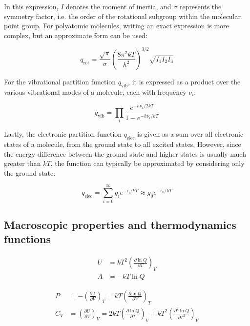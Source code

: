 In this expression, $I$ denotes the moment of inertia, and $\sigma$ represents the symmetry factor, i.e. the order of the rotational subgroup within the molecular point group. For polyatomic molecules, writing an exact expression is more complex, but an approximate form can be used:

\begin{equation}
q_{\text{rot}} = \frac{\sqrt{\pi}}{\sigma}\left(\frac{8\pi^2kT}{h^2}\right)^{3/2} \sqrt{I_1I_2I_3}
\end{equation}

For the vibrational partition function $q_\text{vib}$, it is expressed as a product over the various vibrational modes of a molecule, each with frequency $\nu_i$:

\begin{equation}
q_{\text{vib}} = \prod_{i} \frac{e^{-h\nu_i/2kT}}{1-e^{-h\nu_i/kT}}
\end{equation}

Lastly, the electronic partition function $q_\text{elec}$ is given as a sum over all electronic states of a molecule, from the ground state to all excited states. However, since the energy difference between the ground state and higher states is usually much greater than $kT$, the function can typically be approximated by considering only the ground state:

\begin{equation}
q_{\text{elec}} = \sum_{i=0}^{\infty} g_i e^{-\epsilon_i/kT} \approx g_0 e^{-\epsilon_0/kT}
\end{equation}

\subsection{Macroscopic properties and thermodynamics functions}

\begin{align}
U &= kT^2 \left(\frac{\partial \ln Q}{\partial T}\right)_V \\
A &= -kT\ln Q \tag{14.18}
\end{align}

\begin{align}
P &= -\left(\frac{\partial A}{\partial V}\right)_T = kT\left(\frac{\partial \ln Q}{\partial V}\right)_T \tag{14.19} \\
C_V &= \left(\frac{\partial U}{\partial V}\right)_V = 2kT\left(\frac{\partial \ln Q}{\partial T}\right)_V + kT^2\left(\frac{\partial^2 \ln Q}{\partial T^2}\right)_V
\end{align}

